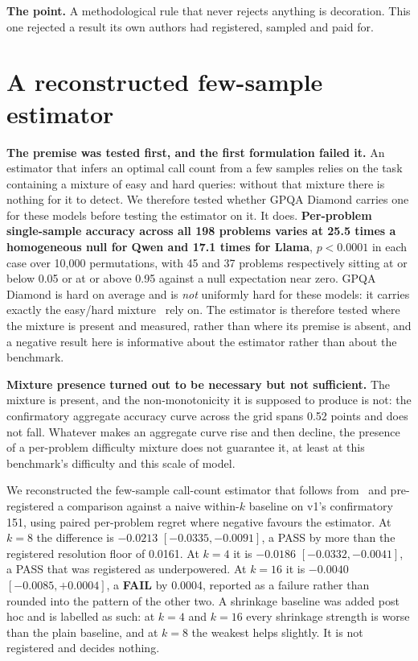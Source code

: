 \documentclass{article}
\begin{document}
\textbf{The point.} A methodological rule that never rejects anything is
decoration. This one rejected a result its own authors had registered, sampled
and paid for.

\section{A reconstructed few-sample estimator}
\label{sec:threada}

\textbf{The premise was tested first, and the first formulation failed it.}
An estimator that infers an optimal call count from a few samples relies on the
task containing a mixture of easy and hard queries: without that mixture there
is nothing for it to detect. We therefore tested whether GPQA Diamond carries
one for these models before testing the estimator on it. It does.
\textbf{Per-problem single-sample accuracy across all 198 problems varies at
25.5 times a homogeneous null for Qwen and 17.1 times for Llama}, $p < 0.0001$
in each case over 10,000 permutations, with 45 and 37 problems respectively
sitting at or below 0.05 or at or above 0.95 against a null expectation near
zero. GPQA Diamond is hard on average and is \emph{not} uniformly hard for
these models: it carries exactly the easy/hard mixture~\citet{chen2024more}
rely on. The estimator is therefore tested where the mixture is present and
measured, rather than where its premise is absent, and a negative result here
is informative about the estimator rather than about the benchmark.

\textbf{Mixture presence turned out to be necessary but not sufficient.} The
mixture is present, and the non-monotonicity it is supposed to produce is not:
the confirmatory aggregate accuracy curve across the grid spans 0.52 points and
does not fall. Whatever makes an aggregate curve rise and then decline, the
presence of a per-problem difficulty mixture does not guarantee it, at least at
this benchmark's difficulty and this scale of model.

We reconstructed the few-sample call-count estimator that follows
from~\citet{chen2024more} and pre-registered a comparison against a naive
within-$k$ baseline on v1's confirmatory 151, using paired per-problem regret
where negative favours the estimator. At $k=8$ the difference is $-0.0213$
$[-0.0335, -0.0091]$, a PASS by more than the registered resolution floor of
0.0161. At $k=4$ it is $-0.0186$ $[-0.0332, -0.0041]$, a PASS that was
registered as underpowered. At $k=16$ it is $-0.0040$ $[-0.0085, +0.0004]$, a
\textbf{FAIL} by 0.0004, reported as a failure rather than rounded into the
pattern of the other two. A shrinkage baseline was added post hoc and is
labelled as such: at $k=4$ and $k=16$ every shrinkage strength is worse than
the plain baseline, and at $k=8$ the weakest helps slightly. It is not
registered and decides nothing.
\end{document}
